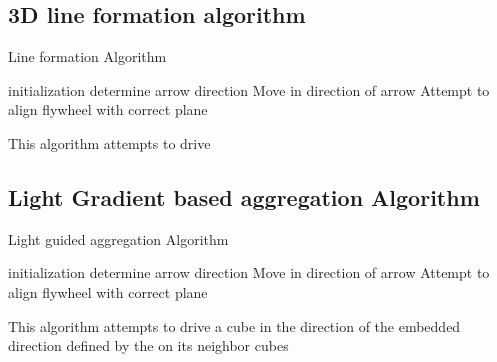 \subsection{3D line formation algorithm}
\label{sec:algLine}

\begin{algorithm}[ht] 
	\caption{Line formation Algorithm}
	\label{algorithmLine}
	\SetAlgoLined
	initialization\;
	{
		determine arrow direction\;
		{
			Move in direction of arrow\;
		}
		{
			Attempt to align flywheel with correct plane\;
		}
	}
	\caption{This algorithm attempts to drive }
	
\end{algorithm}


\subsection{Light Gradient based aggregation Algorithm}
\label{sec:algLight}

\begin{algorithm}[htbp] 
	\caption{Light guided aggregation Algorithm}
	\label{algorithmAggregate}
	\SetAlgoLined
	initialization\;
	{
		determine arrow direction\;
		{
			Move in direction of arrow\;
		}
		{
			Attempt to align flywheel with correct plane\;
		}
	}
	\caption{This algorithm attempts to drive a cube in the direction of the embedded direction defined by the \tagName on its neighbor cubes}
	
\end{algorithm}